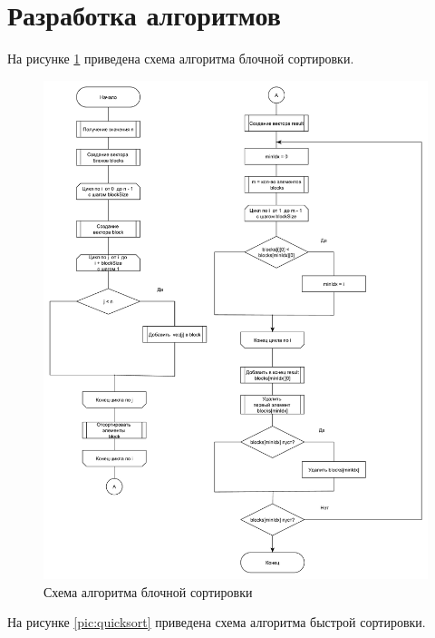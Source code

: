 \section{Разработка алгоритмов}

На рисунке \ref{pic:blocksort} приведена схема алгоритма блочной сортировки.

\begin{figure}[H]
	\centering
	\includegraphics[scale=0.62]{assets/blocksort.pdf}
	\caption{Схема алгоритма блочной сортировки}
	\label{pic:blocksort}
\end{figure}

\newpage

На рисунке \ref{pic:quicksort} приведена схема алгоритма быстрой сортировки.

